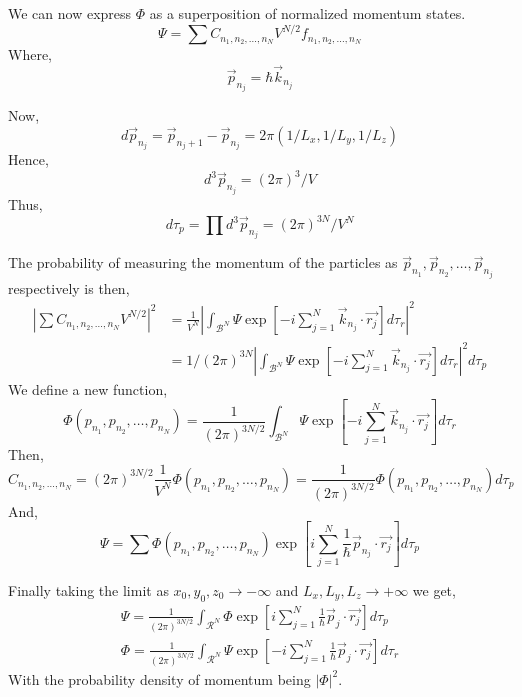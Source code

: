 \documentclass[a4paper, 11pt]{article}
\begin{document}
We can now express $\Phi$ as a superposition of normalized momentum states.
\begin{equation}
	\Psi = \sum C_{n_1, n_2, \ldots, n_N} V^{N/2} f_{n_1, n_2, \ldots, n_N}
\end{equation}
Where,
\begin{equation}
	\vec{p}_{n_j} = \hbar \vec{k}_{n_j}
\end{equation}

Now,
\begin{equation}
	d \vec{p}_{n_j} = \vec{p}_{n_j+1} - \vec{p}_{n_j} = 2\pi \left( 1/L_x, 1/L_y, 1/L_z \right)
\end{equation}
Hence,
\begin{equation}
	d^3 \vec{p}_{n_j} = (2\pi)^3 / V
\end{equation}
Thus,
\begin{equation}
	d\tau_p = \prod d^3 \vec{p}_{n_j} = (2\pi)^{3N} / V^N
\end{equation}

The probability of measuring the momentum of the particles as $\vec{p}_{n_1}, \vec{p}_{n_2}, \ldots,
 \vec{p}_{n_j}$ respectively is then,
 \begin{align*}
	 \left| \sum C_{n_1, n_2, \ldots, n_N} V^{N/2} \right|^2 &= \frac{1}{V^N} \left|
	 \int_{\mathcal{B}^N} \Psi \exp \left[ -i \sum_{j = 1}^N \vec{k}_{n_j} \cdot \vec{r_j} \right]
	 d\tau_r \right|^2 \\
	 &= 1/(2\pi)^{3N} \left| \int_{\mathcal{B}^N} \Psi \exp \left[ -i \sum_{j = 1}^N \vec{k}_{n_j}
	 \cdot \vec{r_j} \right] d\tau_r \right|^2 d\tau_p
 \end{align*}
We define a new function,
\begin{equation}
	\Phi(p_{n_1}, p_{n_2}, \ldots, p_{n_N}) = \frac{1}{(2\pi)^{3N/2}} \int_{\mathcal{B}^N} \Psi \exp
	\left[ -i \sum_{j = 1}^N \vec{k}_{n_j} \cdot \vec{r_j} \right] d\tau_r
\end{equation}
Then,
\begin{equation}
	C_{n_1, n_2, \ldots, n_N} = (2\pi)^{3N/2} \frac{1}{V^N} \Phi(p_{n_1}, p_{n_2}, \ldots, p_{n_N})
	= \frac{1}{(2\pi)^{3N/2}} \Phi(p_{n_1}, p_{n_2}, \ldots, p_{n_N}) d\tau_p
\end{equation}
And,
\begin{equation}
	\Psi = \sum \Phi(p_{n_1}, p_{n_2}, \ldots, p_{n_N}) \exp \left[ i \sum_{j = 1}^N \frac{1}{\hbar}
	\vec{p}_{n_j} \cdot \vec{r_j} \right] d\tau_p
\end{equation}

Finally taking the limit as $x_0, y_0, z_0 \to -\infty$ and $L_x, L_y, L_z \to +\infty$ we get,
\begin{equation}
	\begin{aligned}
		\Psi = \frac{1}{(2\pi)^{3N/2}} \int_{\mathcal{R}^N} \Phi \exp \left[ i \sum_{j = 1}^N \frac{1}{\hbar} \vec{p}_j \cdot \vec{r_j} \right] d\tau_p \\
		\Phi = \frac{1}{(2\pi)^{3N/2}} \int_{\mathcal{R}^N} \Psi \exp \left[ -i \sum_{j = 1}^N \frac{1}{\hbar} \vec{p}_j \cdot \vec{r_j} \right] d\tau_r
	\end{aligned}
\end{equation}
With the probability density of momentum being $|\Phi|^2$.
\end{document}
